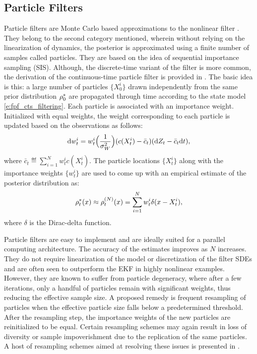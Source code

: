 \subsection{Particle Filters}
\label{e:fpf_particle}
Particle filters are Monte Carlo based approximations to the nonlinear filter \cite{doucet2000sequential}. They belong to the second category mentioned, wherein without relying on the linearization of dynamics, the posterior is approximated using a finite number of samples called particles. They are based on the idea of sequential importance sampling (SIS). Although, the discrete-time variant of the filter is more common, the derivation of the continuous-time particle filter is provided in \cite{kutsurpfi19}. The basic idea is this: a large number of particles $\{X^i_0\}$ drawn independently from the same prior distribution $\rho^*_0$ are propagated through time according to the state model \eqref{e:fpf_cts_filtering}. Each particle is associated with an importance weight. Initialized with equal weights, the weight corresponding to each particle is updated based on the observations as follows:
\begin{equation}
\ud w^i_t = w^i_t  \Bigl(\frac{1}{\sigma^2_W} \Bigr) (c(X^i_t)  - \bar{c}_t ) (\ud Z_t - \bar{c}_t \ud t),
\label{e:fpf_particle_wt}
\end{equation}
where $\bar{c}_t \eqdef \sum_{i=1}^N w^i_t c(X^i_t)$. The particle locations $\{X^i_t\}$ along with the importance weights $\{w^i_t\}$ are used to come up with an empirical estimate of the posterior distribution as:
\begin{equation}
\pr^*_t(x) \approx \pr^{(N)}_t(x) = \sum_{i=1}^N w^i_t \delta(x -X^i_t),
\label{e:fpf_particle_empirical}
\end{equation}
where $\delta$ is the Dirac-delta function. 

Particle filters are easy to implement and are ideally suited for a parallel computing architecture. The accuracy of the estimates improves as $N$ increases. They do not require linearization of the model or discretization of the filter SDEs and are often seen to outperform the EKF in highly nonlinear examples. However, they are known to suffer from particle degeneracy, where after a few iterations, only a handful of particles remain with significant weights, thus reducing the effective sample size. A proposed remedy is frequent resampling of particles when the effective particle size falls below a predetermined threshold. After the resampling step, the importance weights of the new particles are reinitialized to be equal. Certain resampling schemes may again result in loss of diversity or sample impoverishment due to the replication of the same particles. A host of resampling schemes aimed at resolving these issues is presented in \cite{budchelee07, arumasgorcla02}.
 
